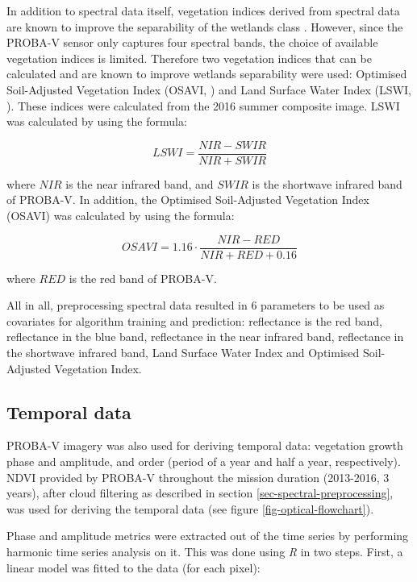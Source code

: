 \documentclass[a4paper,12pt]{scrbook}
\begin{document}
In addition to spectral data itself, vegetation indices derived from spectral data are known to improve the separability of the wetlands class \citep{zhao2009indices,davranche2010wetland}. However, since the PROBA-V sensor only captures four spectral bands, the choice of available vegetation indices is limited. Therefore two vegetation indices that can be calculated and are known to improve wetlands separability were used: Optimised Soil-Adjusted Vegetation Index (OSAVI, \citealt{rondeaux1996osavi}) and Land Surface Water Index (LSWI, \citealt{xiao2004lswi, dong2014lswi}). These indices were calculated from the 2016 summer composite image. LSWI was calculated by using the formula:

$$ LSWI = \frac{NIR - SWIR}{NIR + SWIR} $$

where $NIR$ is the near infrared band, and $SWIR$ is the shortwave infrared band of PROBA-V. In addition, the Optimised Soil-Adjusted Vegetation Index (OSAVI) was calculated by using the formula:

$$ OSAVI = 1.16 \cdot{} \frac{NIR-RED}{NIR+RED+0.16} $$

where $RED$ is the red band of PROBA-V.

All in all, preprocessing spectral data resulted in 6 parameters to be used as covariates for algorithm training and prediction: reflectance is the red band, reflectance in the blue band, reflectance in the near infrared band, reflectance in the shortwave infrared band, Land Surface Water Index and Optimised Soil-Adjusted Vegetation Index.

\subsection{Temporal data}

PROBA-V imagery was also used for deriving temporal data: vegetation growth phase and amplitude,  and  order (period of a year and half a year, respectively). NDVI provided by PROBA-V throughout the mission duration (2013-2016, 3 years), after cloud filtering as described in section \ref{sec-spectral-preprocessing}, was used for deriving the temporal data (see figure \ref{fig-optical-flowchart}).

Phase and amplitude metrics were extracted out of the time series by performing harmonic time series analysis \citep{rayner1971introduction,jakubauskas2001harmonic} on it. This was done using \textit{R} in two steps. First, a linear model was fitted to the data (for each pixel):
\end{document}
